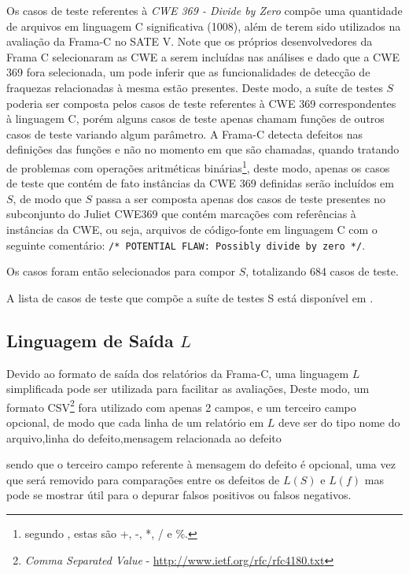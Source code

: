 Os casos de teste referentes à \textit{CWE 369 - Divide by Zero} compõe uma quantidade de arquivos em linguagem C significativa (1008), além de terem sido utilizados na avaliação da Frama-C no SATE V. Note que os próprios desenvolvedores da Frama C selecionaram as CWE a serem incluídas nas análises e dado que a CWE 369 fora selecionada, um pode inferir que as funcionalidades de detecção de fraquezas relacionadas à mesma estão presentes. Deste modo, a suíte de testes $S$ poderia ser composta pelos casos de teste referentes à CWE 369 correspondentes à linguagem C, porém alguns casos de teste apenas chamam funções de outros casos de teste variando algum parâmetro.  A Frama-C detecta defeitos nas definições das funções e não no momento em que são chamadas, quando tratando de problemas com operações aritméticas binárias\footnote{segundo \cite{kernighan}, estas são +, -, *, / e \%.}, deste modo, apenas os casos de teste que contém de fato instâncias da CWE 369 definidas serão incluídos em $S$, de modo que  $S$ passa a ser composta apenas dos casos de teste presentes no subconjunto do Juliet CWE369 que contém marcações com referências à instâncias da CWE, ou seja, arquivos de código-fonte em linguagem C com o seguinte comentário:
  \lstinline{/* POTENTIAL FLAW: Possibly divide by zero */}.

  Os casos foram então selecionados para compor $S$, totalizando 684 casos de teste.

  A lista de casos de teste que compõe a suíte de testes S está disponível em .

  \subsection{Linguagem de Saída $L$}

  Devido ao formato de saída dos relatórios da Frama-C, uma linguagem $L$ simplificada pode ser utilizada para facilitar as avaliações, Deste modo, um formato CSV\footnote{\textit{Comma Separated Value} - \url{http://www.ietf.org/rfc/rfc4180.txt}} fora utilizado com apenas 2 campos, e um terceiro campo opcional, de modo que cada linha de um relatório em $L$ deve ser do tipo
  nome do arquivo,linha do defeito,mensagem relacionada ao defeito

  sendo que o terceiro campo referente à mensagem do defeito é opcional, uma vez que será removido para comparações entre os defeitos de $L(S)$ e $L(f)$ mas pode se mostrar útil para o depurar falsos positivos ou falsos negativos.

